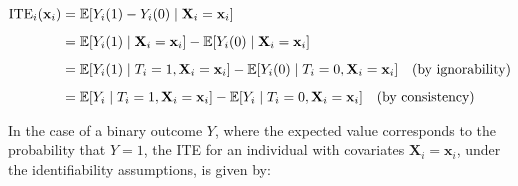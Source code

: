 \medskip



\begin{align}
\text{ITE}_i(\mathbf{x}_i) &= \mathbb{E}[Y_i(1) - Y_i(0) \mid \mathbf{X}_i = \mathbf{x}_i] \notag \\[0.5em]
&= \mathbb{E}[Y_i(1) \mid \mathbf{X}_i = \mathbf{x}_i] - \mathbb{E}[Y_i(0) \mid \mathbf{X}_i = \mathbf{x}_i] \notag \\[0.5em]
&= \mathbb{E}[Y_i(1) \mid T_i = 1, \mathbf{X}_i = \mathbf{x}_i] 
 - \mathbb{E}[Y_i(0) \mid T_i = 0, \mathbf{X}_i = \mathbf{x}_i] \quad \text{(by ignorability)} \notag \\[0.5em]
&= \mathbb{E}[Y_i \mid T_i = 1, \mathbf{X}_i = \mathbf{x}_i] 
 - \mathbb{E}[Y_i \mid T_i = 0, \mathbf{X}_i = \mathbf{x}_i] \quad \text{(by consistency)}
\end{align}



% 
% 
% 
% 
% 
% 
% 
% 

\medskip

In the case of a binary outcome $Y$, where the expected value corresponds to the probability that $Y = 1$, the ITE for an individual with covariates $\mathbf{X}_i = \mathbf{x}_i$, under the identifiability assumptions, is given by:

